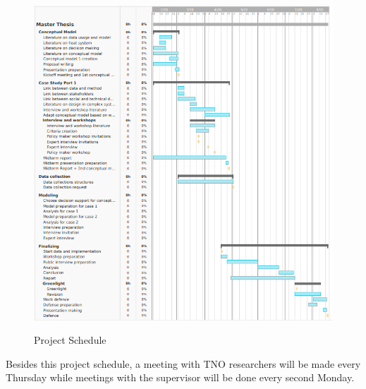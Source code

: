 \begin{figure}[htbp!]
  \caption{Project Schedule}
  \centering
  \includegraphics[width=1.2\textwidth]{Images/schedules.PNG}
   \label{fig:schedule}
\end{figure}

Besides this project schedule, a meeting with TNO researchers will be made every Thursday while meetings with the supervisor will be done every second Monday. 








